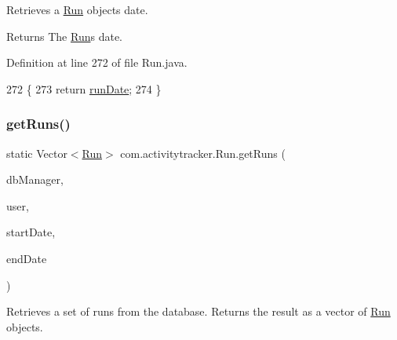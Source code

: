 Retrieves a \mbox{\hyperlink{classcom_1_1activitytracker_1_1_run}{Run}} object\textquotesingle{}s date.

\begin{DoxyReturn}{Returns}
The \mbox{\hyperlink{classcom_1_1activitytracker_1_1_run}{Run}}\textquotesingle{}s date. 
\end{DoxyReturn}


Definition at line 272 of file Run.\+java.


\begin{DoxyCode}
272                              \{
273         \textcolor{keywordflow}{return} \mbox{\hyperlink{classcom_1_1activitytracker_1_1_run_a2f519da043ea384f1ba0d156f4971367}{runDate}};
274     \}
\end{DoxyCode}
\mbox{\label{classcom_1_1activitytracker_1_1_run_a1aa1fb01eabff586e16d88f19f7df743}} 
\subsubsection{\texorpdfstring{get\+Runs()}{getRuns()}}
{\footnotesize\ttfamily static Vector$<$\mbox{\hyperlink{classcom_1_1activitytracker_1_1_run}{Run}}$>$ com.\+activitytracker.\+Run.\+get\+Runs (\begin{DoxyParamCaption}\item[{final \mbox{\hyperlink{classcom_1_1activitytracker_1_1_d_b_manager}{D\+B\+Manager}}}]{db\+Manager,  }\item[{final \mbox{\hyperlink{classcom_1_1activitytracker_1_1_user}{User}}}]{user,  }\item[{final Date}]{start\+Date,  }\item[{final Date}]{end\+Date }\end{DoxyParamCaption})\hspace{0.3cm}{\ttfamily [static]}}

Retrieves a set of runs from the database. Returns the result as a vector of \mbox{\hyperlink{classcom_1_1activitytracker_1_1_run}{Run}} objects.


